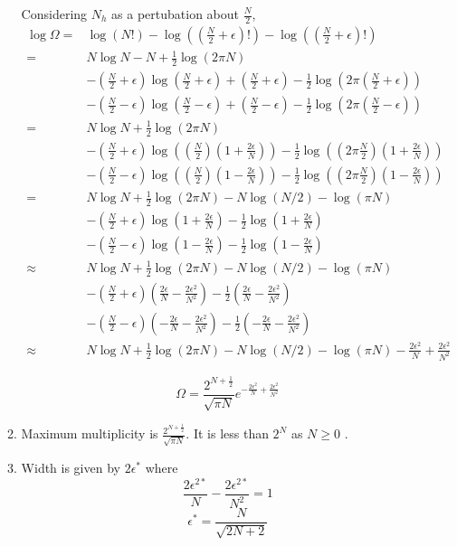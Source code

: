 \documentclass[letterpaper,12pt]{article}
\begin{document}
\begin{enumerate}
\begin{enumerate}
Considering $N_h$ as a pertubation about $\frac{N}{2}$,
\begin{align*}
\log \Omega  = &\log(N!)-\log((\frac{N}{2}+\epsilon)!)-\log((\frac{N}{2}+\epsilon)!)
\\
=& N \log N - N +\frac{1}{2}\log(2\pi N)
\\&-
(\frac{N}{2}+\epsilon) \log (\frac{N}{2}+\epsilon) + (\frac{N}{2}+\epsilon) -\frac{1}{2}\log(2\pi (\frac{N}{2}+\epsilon))
\\&
- (\frac{N}{2}-\epsilon) \log (\frac{N}{2}-\epsilon) + (\frac{N}{2}-\epsilon) -\frac{1}{2}\log(2\pi (\frac{N}{2}-\epsilon))\\
=& N \log N  +\frac{1}{2}\log(2\pi N)
\\&-
(\frac{N}{2}+\epsilon) \log ((\frac{N}{2})(1+\frac{2\epsilon}{N}))  -\frac{1}{2}\log ((2\pi \frac{N}{2})(1+\frac{2\epsilon}{N}))
\\&
- (\frac{N}{2}-\epsilon) \log ((\frac{N}{2})(1-\frac{2\epsilon}{N}))   -\frac{1}{2}\log ((2\pi \frac{N}{2})(1-\frac{2\epsilon}{N}))\\
=& N \log N  +\frac{1}{2}\log(2\pi N)-N\log(N/2)-\log(\pi N)
\\&-
(\frac{N}{2}+\epsilon) \log (1+\frac{2\epsilon}{N})  -\frac{1}{2}\log (1+\frac{2\epsilon}{N})
\\&
- (\frac{N}{2}-\epsilon) \log (1-\frac{2\epsilon}{N})   -\frac{1}{2}\log (1-\frac{2\epsilon}{N})\\
\approx & N \log N  +\frac{1}{2}\log(2\pi N)-N\log(N/2)-\log(\pi N)
\\&-
(\frac{N}{2}+\epsilon)  (\frac{2\epsilon}{N}-\frac{2\epsilon^2}{N^2})  -\frac{1}{2} (\frac{2\epsilon}{N}-\frac{2\epsilon^2}{N^2})
\\&
- (\frac{N}{2}-\epsilon)  (-\frac{2\epsilon}{N}-\frac{2\epsilon^2}{N^2})    -\frac{1}{2} (-\frac{2\epsilon}{N}-\frac{2\epsilon^2}{N^2}) \\
\approx & N \log N  +\frac{1}{2}\log(2\pi N)-N\log(N/2)-\log(\pi N)-\frac{2\epsilon^2}{N}+\frac{2\epsilon^2}{N^2}
\end{align*}

\[\Omega = \frac{2^{N+\frac{1}{2}}}{\sqrt{\pi N}}e^{-\frac{2\epsilon^2}{N}+\frac{2\epsilon^2}{N^2}}\]
\item

Maximum multiplicity is $\frac{2^{N+\frac{1}{2}}}{\sqrt{\pi N}}$. It is less than $2^N$ as $N \geq 0$ .

\item
Width is given by $2\epsilon^*$ where
\[\frac{2\epsilon^{2*}}{N}-\frac{2\epsilon^{2*}}{N^2}=1\]
\[\epsilon^{*}=\frac{N}{\sqrt{2N+2}}\]


\end{enumerate}
\end{enumerate}
\end{document}

